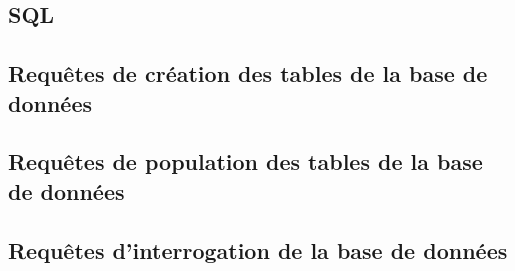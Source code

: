 \documentclass[a4paper,12pt]{article}
\begin{document}
\begin{appendices}
\section*{SQL}
\subsection{Requêtes de création des tables de la base de données}

\subsection{Requêtes de population des tables de la base de données}

\subsection{Requêtes d'interrogation de la base de données}

\end{appendices}
\end{document}
